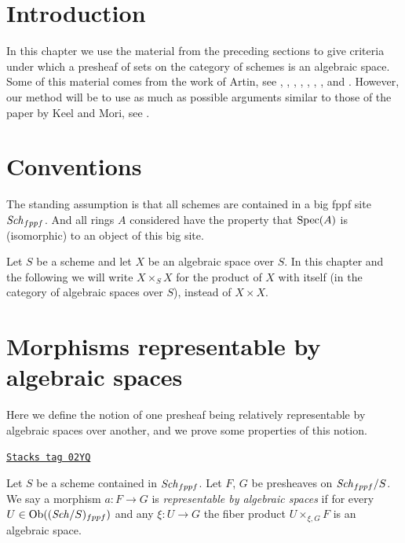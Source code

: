 \section{Introduction}
\label{bootstrap-section-introduction}
In this chapter we use the material from the preceding sections to
give criteria under which a presheaf of sets on the category of schemes
is an algebraic space. Some of this material comes from the work
of Artin, see \cite{ArtinI}, \cite{ArtinII},
\cite{Artin-Theorem-Representability},
\cite{Artin-Construction-Techniques},
\cite{Artin-Algebraic-Spaces},
\cite{Artin-Algebraic-Approximation},
\cite{Artin-Implicit-Function},
and \cite{ArtinVersal}.
However, our method will be to use as much as possible arguments
similar to those of the paper by Keel and Mori, see
\cite{K-M}.

\section{Conventions}
\label{bootstrap-section-conventions}
The standing assumption is that all schemes are contained in
a big fppf site $\mathit{Sch}_{fppf}$. And all rings $A$ considered
have the property that $\operatorname{Spec}(A)$ is (isomorphic) to an
object of this big site.

\medskip\noindent
Let $S$ be a scheme and let $X$ be an algebraic space over $S$.
In this chapter and the following we will write $X \times_S X$
for the product of $X$ with itself (in the category of algebraic
spaces over $S$), instead of $X \times X$.

\section{Morphisms representable by algebraic spaces}
\label{bootstrap-section-morphism-representable-by-spaces}
Here we define the notion of one presheaf being relatively representable
by algebraic spaces over another, and we prove some properties of this notion.

\begin{definition}
\label{bootstrap-definition-morphism-representable-by-spaces}
\href{https://stacks.math.columbia.edu/tag/02YQ}{\texttt{Stacks tag 02YQ}}

Let $S$ be a scheme contained in $\mathit{Sch}_{fppf}$.
Let $F$, $G$ be presheaves on $\mathit{Sch}_{fppf}/S$.
We say a morphism $a : F \to G$ is
{\it representable by algebraic spaces}
if for every $U \in \operatorname{Ob}((\mathit{Sch}/S)_{fppf})$ and
any $\xi : U \to G$ the fiber product $U \times_{\xi, G} F$
is an algebraic space.
\end{definition}

